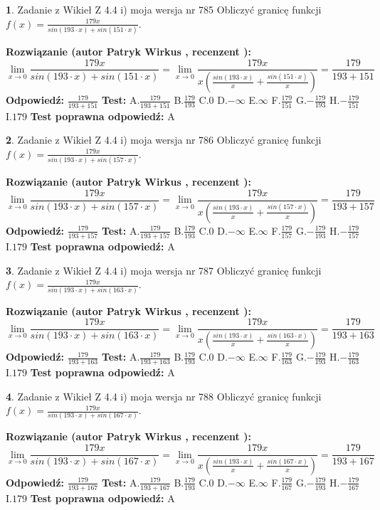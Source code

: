 \documentclass[12pt, a4paper]{article}
\theoremstyle{definition} %
\newtheorem{zad}{}
\newcommand{\zadStart}[1]{\begin{zad}#1\newline}
\newcommand{\zadStop}{\end{zad}}
\newcommand{\rozwStart}[2]{\noindent \textbf{Rozwiązanie (autor #1 , recenzent #2): }\newline}
\newcommand{\rozwStop}{\newline}
\newcommand{\odpStart}{\noindent \textbf{Odpowiedź:}\newline}
\newcommand{\odpStop}{\newline}
\newcommand{\testStart}{\noindent \textbf{Test:}\newline}
\newcommand{\testStop}{\newline}
\newcommand{\kluczStart}{\noindent \textbf{Test poprawna odpowiedź:}\newline}
\newcommand{\kluczStop}{\newline}
\begin{document}
\zadStart{Zadanie z Wikieł Z 4.4 i) moja wersja nr 785}
Obliczyć granicę funkcji $f(x)=\frac{179x}{sin(193\cdot x) +sin(151\cdot x)}$.
\zadStop
\rozwStart{Patryk Wirkus}{}
$$\lim\limits_{x\to 0}\frac{179x}{sin(193\cdot x) +sin(151\cdot x)}=\lim\limits_{x\to 0}\frac{179x}{x(\frac{sin(193\cdot x)}{x}+\frac{sin(151\cdot x)}{x})}=\frac{179}{193+151}$$
\rozwStop
\odpStart
$\frac{179}{193+151}$
\odpStop
\testStart
A.$\frac{179}{193+151}$
B.$\frac{179}{193}$
C.$0$
D.$-\infty$
E.$\infty$
F.$\frac{179}{151}$
G.$-\frac{179}{193}$
H.$-\frac{179}{151}$
I.$179$
\testStop
\kluczStart
A
\kluczStop



\zadStart{Zadanie z Wikieł Z 4.4 i) moja wersja nr 786}
Obliczyć granicę funkcji $f(x)=\frac{179x}{sin(193\cdot x) +sin(157\cdot x)}$.
\zadStop
\rozwStart{Patryk Wirkus}{}
$$\lim\limits_{x\to 0}\frac{179x}{sin(193\cdot x) +sin(157\cdot x)}=\lim\limits_{x\to 0}\frac{179x}{x(\frac{sin(193\cdot x)}{x}+\frac{sin(157\cdot x)}{x})}=\frac{179}{193+157}$$
\rozwStop
\odpStart
$\frac{179}{193+157}$
\odpStop
\testStart
A.$\frac{179}{193+157}$
B.$\frac{179}{193}$
C.$0$
D.$-\infty$
E.$\infty$
F.$\frac{179}{157}$
G.$-\frac{179}{193}$
H.$-\frac{179}{157}$
I.$179$
\testStop
\kluczStart
A
\kluczStop



\zadStart{Zadanie z Wikieł Z 4.4 i) moja wersja nr 787}
Obliczyć granicę funkcji $f(x)=\frac{179x}{sin(193\cdot x) +sin(163\cdot x)}$.
\zadStop
\rozwStart{Patryk Wirkus}{}
$$\lim\limits_{x\to 0}\frac{179x}{sin(193\cdot x) +sin(163\cdot x)}=\lim\limits_{x\to 0}\frac{179x}{x(\frac{sin(193\cdot x)}{x}+\frac{sin(163\cdot x)}{x})}=\frac{179}{193+163}$$
\rozwStop
\odpStart
$\frac{179}{193+163}$
\odpStop
\testStart
A.$\frac{179}{193+163}$
B.$\frac{179}{193}$
C.$0$
D.$-\infty$
E.$\infty$
F.$\frac{179}{163}$
G.$-\frac{179}{193}$
H.$-\frac{179}{163}$
I.$179$
\testStop
\kluczStart
A
\kluczStop



\zadStart{Zadanie z Wikieł Z 4.4 i) moja wersja nr 788}
Obliczyć granicę funkcji $f(x)=\frac{179x}{sin(193\cdot x) +sin(167\cdot x)}$.
\zadStop
\rozwStart{Patryk Wirkus}{}
$$\lim\limits_{x\to 0}\frac{179x}{sin(193\cdot x) +sin(167\cdot x)}=\lim\limits_{x\to 0}\frac{179x}{x(\frac{sin(193\cdot x)}{x}+\frac{sin(167\cdot x)}{x})}=\frac{179}{193+167}$$
\rozwStop
\odpStart
$\frac{179}{193+167}$
\odpStop
\testStart
A.$\frac{179}{193+167}$
B.$\frac{179}{193}$
C.$0$
D.$-\infty$
E.$\infty$
F.$\frac{179}{167}$
G.$-\frac{179}{193}$
H.$-\frac{179}{167}$
I.$179$
\testStop
\kluczStart
A
\kluczStop
\end{document}
